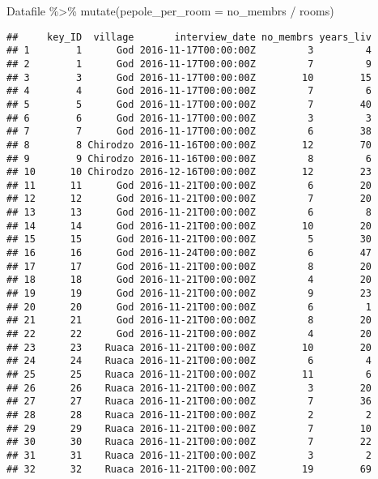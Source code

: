 \documentclass[
]{article}
\newenvironment{Shaded}{\begin{snugshade}}{\end{snugshade}}
\newcommand{\AttributeTok}[1]{\textcolor[rgb]{0.77,0.63,0.00}{#1}}
\newcommand{\FunctionTok}[1]{\textcolor[rgb]{0.00,0.00,0.00}{#1}}
\newcommand{\NormalTok}[1]{#1}
\newcommand{\SpecialCharTok}[1]{\textcolor[rgb]{0.00,0.00,0.00}{#1}}
\begin{document}
\begin{Shaded}
\begin{Highlighting}[]
\NormalTok{Datafile }\SpecialCharTok{\%\textgreater{}\%} 
  \FunctionTok{mutate}\NormalTok{(}\AttributeTok{pepole\_per\_room =}\NormalTok{ no\_membrs }\SpecialCharTok{/}\NormalTok{ rooms)}
\end{Highlighting}
\end{Shaded}

\begin{verbatim}
##     key_ID  village       interview_date no_membrs years_liv
## 1        1      God 2016-11-17T00:00:00Z         3         4
## 2        1      God 2016-11-17T00:00:00Z         7         9
## 3        3      God 2016-11-17T00:00:00Z        10        15
## 4        4      God 2016-11-17T00:00:00Z         7         6
## 5        5      God 2016-11-17T00:00:00Z         7        40
## 6        6      God 2016-11-17T00:00:00Z         3         3
## 7        7      God 2016-11-17T00:00:00Z         6        38
## 8        8 Chirodzo 2016-11-16T00:00:00Z        12        70
## 9        9 Chirodzo 2016-11-16T00:00:00Z         8         6
## 10      10 Chirodzo 2016-12-16T00:00:00Z        12        23
## 11      11      God 2016-11-21T00:00:00Z         6        20
## 12      12      God 2016-11-21T00:00:00Z         7        20
## 13      13      God 2016-11-21T00:00:00Z         6         8
## 14      14      God 2016-11-21T00:00:00Z        10        20
## 15      15      God 2016-11-21T00:00:00Z         5        30
## 16      16      God 2016-11-24T00:00:00Z         6        47
## 17      17      God 2016-11-21T00:00:00Z         8        20
## 18      18      God 2016-11-21T00:00:00Z         4        20
## 19      19      God 2016-11-21T00:00:00Z         9        23
## 20      20      God 2016-11-21T00:00:00Z         6         1
## 21      21      God 2016-11-21T00:00:00Z         8        20
## 22      22      God 2016-11-21T00:00:00Z         4        20
## 23      23    Ruaca 2016-11-21T00:00:00Z        10        20
## 24      24    Ruaca 2016-11-21T00:00:00Z         6         4
## 25      25    Ruaca 2016-11-21T00:00:00Z        11         6
## 26      26    Ruaca 2016-11-21T00:00:00Z         3        20
## 27      27    Ruaca 2016-11-21T00:00:00Z         7        36
## 28      28    Ruaca 2016-11-21T00:00:00Z         2         2
## 29      29    Ruaca 2016-11-21T00:00:00Z         7        10
## 30      30    Ruaca 2016-11-21T00:00:00Z         7        22
## 31      31    Ruaca 2016-11-21T00:00:00Z         3         2
## 32      32    Ruaca 2016-11-21T00:00:00Z        19        69

\end{verbatim}
\end{document}
